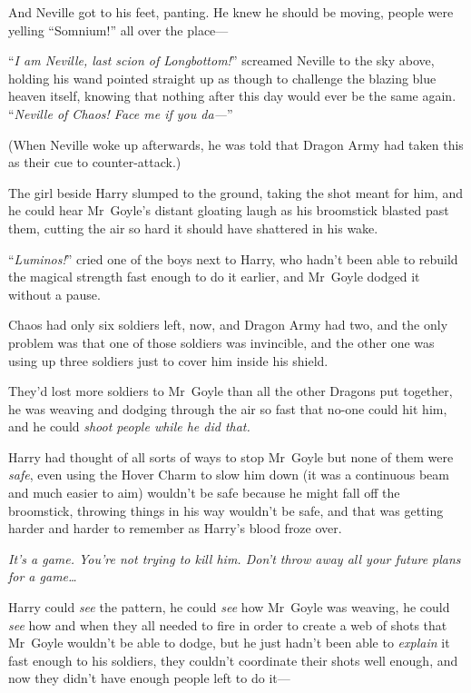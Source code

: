 And Neville got to his feet, panting. He knew he should be moving, people were yelling “Somnium!” all over the place—

“\emph{I am Neville, last scion of Longbottom!}” screamed Neville to the sky above, holding his wand pointed straight up as though to challenge the blazing blue heaven itself, knowing that nothing after this day would ever be the same again. “\emph{Neville of Chaos! Face me if you da—}”

(When Neville woke up afterwards, he was told that Dragon Army had taken this as their cue to counter-attack.)

\later

The girl beside Harry slumped to the ground, taking the shot meant for him, and he could hear Mr~Goyle’s distant gloating laugh as his broomstick blasted past them, cutting the air so hard it should have shattered in his wake.

“\emph{Luminos!}” cried one of the boys next to Harry, who hadn’t been able to rebuild the magical strength fast enough to do it earlier, and Mr~Goyle dodged it without a pause.

Chaos had only six soldiers left, now, and Dragon Army had two, and the only problem was that one of those soldiers was invincible, and the other one was using up three soldiers just to cover him inside his shield.

They’d lost more soldiers to Mr~Goyle than all the other Dragons put together, he was weaving and dodging through the air so fast that no-one could hit him, and he could \emph{shoot people while he did that.}

Harry had thought of all sorts of ways to stop Mr~Goyle but none of them were \emph{safe}, even using the Hover Charm to slow him down (it was a continuous beam and much easier to aim) wouldn’t be safe because he might fall off the broomstick, throwing things in his way wouldn’t be safe, and that was getting harder and harder to remember as Harry’s blood froze over.

\emph{It’s a game. You’re not trying to \emph{kill} him. Don’t throw away all your future plans for a game…}

Harry could \emph{see} the pattern, he could \emph{see} how Mr~Goyle was weaving, he could \emph{see} how and when they all needed to fire in order to create a web of shots that Mr~Goyle wouldn’t be able to dodge, but he just hadn’t been able to \emph{explain} it fast enough to his soldiers, they couldn’t coordinate their shots well enough, and now they didn’t have enough people left to do it—

